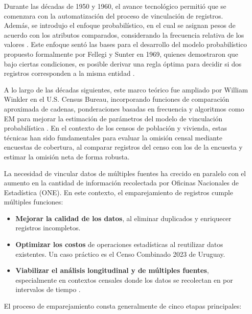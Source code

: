 \documentclass[
  12pt,
]{book}
\providecommand{\tightlist}{%
  \setlength{\itemsep}{0pt}\setlength{\parskip}{0pt}}
\begin{document}
Durante las décadas de 1950 y 1960, el avance tecnológico permitió que se comenzara con la automatización del proceso de vinculación de registros. Además, se introdujo el enfoque probabilístico, en el cual se asignan pesos de acuerdo con los atributos comparados, considerando la frecuencia relativa de los valores \citep[\citet{newcombe1962}]{newcombe1959}. Este enfoque sentó las bases para el desarrollo del modelo probabilístico propuesto formalmente por Fellegi y Sunter en 1969, quienes demostraron que bajo ciertas condiciones, es posible derivar una regla óptima para decidir si dos registros corresponden a la misma entidad \citep{fellegi1969theory}.

A lo largo de las décadas siguientes, este marco teórico fue ampliado por William Winkler en el U.S. Census Bureau, incorporando funciones de comparación aproximada de cadenas, ponderaciones basadas en frecuencia y algoritmos como EM para mejorar la estimación de parámetros del modelo de vinculación probabilística \citep[\citet{winkler2006overview}]{winkler1990}. En el contexto de los censos de población y vivienda, estas técnicas han sido fundamentales para evaluar la omisión censal mediante encuestas de cobertura, al comparar registros del censo con los de la encuesta y estimar la omisión neta de forma robusta.

La necesidad de vincular datos de múltiples fuentes ha crecido en paralelo con el aumento en la cantidad de información recolectada por Oficinas Nacionales de Estadística (ONE). En este contexto, el emparejamiento de registros cumple múltiples funciones:

\begin{itemize}
\tightlist
\item
  \textbf{Mejorar la calidad de los datos}, al eliminar duplicados y enriquecer registros incompletos.
\item
  \textbf{Optimizar los costos} de operaciones estadísticas al reutilizar datos existentes. Un caso práctico es el Censo Combinado 2023 de Uruguay.
\item
  \textbf{Viabilizar el análisis longitudinal y de múltiples fuentes}, especialmente en contextos censales donde los datos se recolectan en por intervalos de tiempo \citep{bleiholder2009data}.
\end{itemize}

El proceso de emparejamiento consta generalmente de cinco etapas principales:
\end{document}
